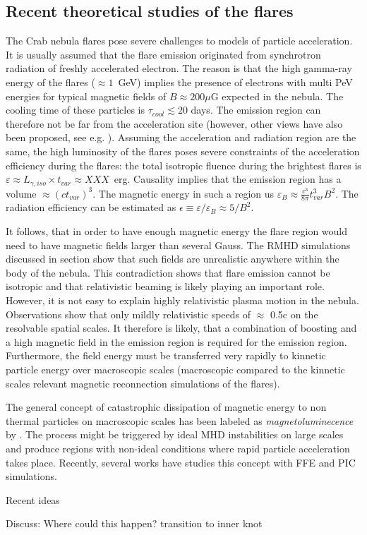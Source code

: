 \subsection{Recent theoretical studies of the flares}

The Crab nebula flares pose severe challenges to models of particle acceleration. It is usually assumed that the flare emission originated from synchrotron radiation of freshly accelerated electron. The reason is that the high gamma-ray energy of the flares ($\approx 1$~GeV) implies the presence of electrons with multi PeV energies for typical magnetic fields of $B \approx 200 \mu$G expected in the nebula. The cooling time of these particles is $\tau_{cool} \lesssim 20$ days. The emission region can therefore not be far from the acceleration site (however, other views have also been proposed, see e.g. \citet{Bykov_2012,2015arXiv151205426Z}). Assuming the acceleration and radiation region are the same, the high luminosity of the flares poses severe constraints of the acceleration efficiency during the flares: the total isotropic fluence during the brightest flares is $\varepsilon \approx L_{\gamma,iso} \times t_{var} \approx XXX $~erg. Causality implies that the emission region has a volume $\approx (c t_{var})^3$. The magnetic energy in such a region us $\varepsilon_B \approx \frac{c^3}{8 \pi} t_{var}^3 B^2$. The radiation efficiency can be estimated as $\epsilon \equiv \varepsilon / \varepsilon_B \approx  5 / B^2$. 

It follows, that in order to have enough magnetic energy the flare region would need to have magnetic fields larger than several Gauss. The RMHD simulations discussed in section show that such fields are unrealistic anywhere within the body of the nebula.  This contradiction shows that flare emission cannot be isotropic and that relativistic beaming is likely playing an important role. However, it is not easy to explain highly relativistic plasma motion in the nebula. Observations show that only mildly relativistic speeds of $\approx$ 0.5c on the resolvable spatial scales. It therefore is likely, that a combination of boosting and a high magnetic field in the emission region is required for the emission region. Furthermore, the field energy must be transferred very rapidly to kinnetic particle energy over macroscopic scales (macroscopic compared to the kinnetic scales relevant magnetic reconnection \citep{Cerutti_2014} simulations of the flares). 

The general concept of catastrophic dissipation of magnetic energy to non thermal particles on macroscopic scales has been labeled as \textit{magnetoluminecence} by \citet{Blandford_2014}. The process might be  triggered by ideal MHD instabilities on large scales and produce regions with non-ideal conditions where rapid particle acceleration takes place. Recently, several works have studies this concept with FFE and PIC simulations. 


Recent ideas  \cite{2016arXiv160403179Y}\cite{2016arXiv160304850N}\cite{2016arXiv160305731L}

Discuss: Where could this happen? transition to inner knot